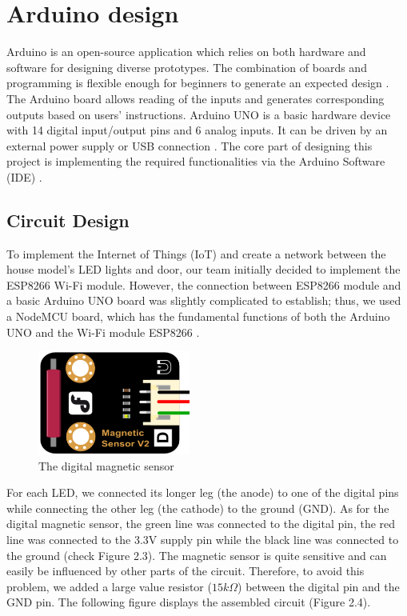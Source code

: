 \documentclass[12pt,a4paper]{report}
\begin{document}
\section{Arduino design}
Arduino is an open-source application which relies on both hardware and software for designing diverse prototypes. The combination of boards and programming is flexible enough for beginners to generate an expected design \cite{arduino}. The Arduino board allows reading of the inputs and generates corresponding outputs based on users’ instructions. Arduino UNO is a basic hardware device with 14 digital input/output pins and 6 analog inputs. It can be driven by an external power supply or USB connection \cite{arduino2}. The core part of designing this project is implementing the required functionalities via the Arduino Software (IDE) \cite{arduino}.
\subsection{Circuit Design}
To implement the Internet of Things (IoT) and create a network between the house model's LED lights and door, our team initially decided to implement the ESP8266 Wi-Fi module. However, the connection between ESP8266 module and a basic Arduino UNO board was slightly complicated to establish; thus, we used a NodeMCU board, which has the fundamental functions of both the Arduino UNO and the Wi-Fi module ESP8266 \cite{nodemcu}.
\begin{figure}[H]
	\centering
	\includegraphics[width=5cm]{figures/sensor.png}
	\caption{The digital magnetic sensor}
\end{figure}
\noindent 
For each LED, we connected its longer leg (the anode) to one of the digital pins while connecting the other leg (the cathode) to the ground (GND). As for the digital magnetic sensor, the green line was connected to the digital pin, the red line was connected to the 3.3V supply pin while the black line was connected to the ground (check Figure 2.3). The magnetic sensor is quite sensitive and can easily be influenced by other parts of the circuit. Therefore, to avoid this problem, we added a large value resistor ($15k\Omega$) between the digital pin and the GND pin. The following figure displays the assembled circuit (Figure 2.4).
\end{document}
